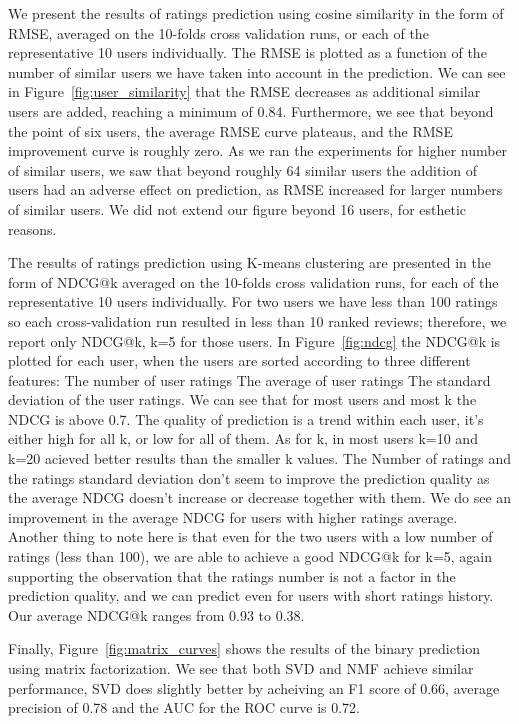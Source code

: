 We present the results of ratings prediction using cosine similarity in the form of RMSE, averaged on the 10-folds cross validation runs, or each of the representative 10 users individually. 
The RMSE is plotted as a function of the number of similar users we have taken into account in the prediction. 
We can see in Figure~\ref{fig:user_similarity} that the RMSE decreases as additional similar users are added, reaching a minimum of 0.84.
Furthermore, we see that beyond the point of six users, the average RMSE curve plateaus, and the RMSE improvement curve is roughly zero.
As we ran the experiments for higher number of similar users, we saw that beyond roughly 64 similar users the addition of users had an adverse effect on prediction, as RMSE increased for larger numbers of similar users. We did not extend our figure beyond 16 users, for esthetic reasons. 

The results of ratings prediction using K-means clustering are presented in the form of NDCG@k averaged on the 10-folds cross validation runs, for each of the representative 10 users individually. For two users we have less than 100 ratings so each cross-validation run resulted in less than 10 ranked reviews; therefore, we report only NDCG@k, k=5 for those users. In Figure~\ref{fig:ndcg} the NDCG@k is plotted for each user, when the users are sorted according to three different features: \blackone The number of user ratings \blacktwo The average of user ratings \blackthree The standard deviation of the user ratings. We can see that for most users and most k the NDCG is above 0.7. The quality of prediction is a trend within each user, it's either high for all k, or low for all of them. As for k, in most users k=10 and k=20 acieved better results than the smaller k values. The Number of ratings and the ratings standard deviation don't seem to improve the prediction quality as the average NDCG doesn't increase or decrease together with them. We do see an improvement in the average NDCG for users with higher ratings average. Another thing to note here is that even for the two users with a low number of ratings (less than 100), we are able to achieve a good NDCG@k for k=5, again supporting the observation that the ratings number is not a factor in the prediction quality, and we can predict even for users with short ratings history. Our average NDCG@k ranges from 0.93 to 0.38.


Finally, Figure~\ref{fig:matrix_curves} shows the results of the binary prediction using matrix factorization. 
We see that both SVD and NMF achieve similar performance, SVD does slightly better by acheiving an F1 score of 0.66, average precision of 0.78 and the AUC for the ROC curve is 0.72.
